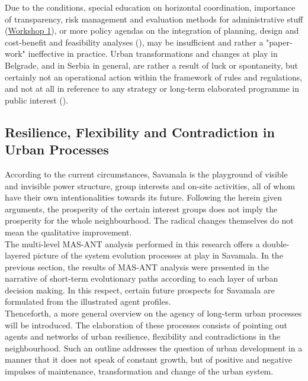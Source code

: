 \documentclass[11pt]{report}
\begin{document}
{Due to the conditions, special education on horizontal coordination, importance of transparency, risk management and evaluation methods for administrative stuff
(\href{Expert Workshop}{Workshop 1}),
or more policy agendas on the integration of planning, design and cost-benefit and feasibility analyses (\href{Zekovic}{\cite{Zekovic ??}}), may be insufficient and rather a "paper-work" ineffective in practice. 
Urban transformations and changes at play in Belgrade, and in Serbia in general, are rather a result of luck or spontaneity, but certainly not an operational action within the framework of rules and regulations, and not at all in reference to any strategy or long-term elaborated programme in public interest (\href{Vanista}{\cite{VanistaLazarevic2015}}).

\subsection{Resilience, Flexibility and Contradiction in Urban Processes}

According to the current circumstances, Savamala is the playground of visible and invisible power structure, group interests and on-site activities, all of whom have their own intentionalities towards its future.
Following the herein given arguments, the prosperity of the certain interest groups does not imply the prosperity for the whole neighbourhood. The radical changes themselves do not mean the qualitative improvement.
\\

The multi-level MAS-ANT analysis performed in this research offers a double-layered picture of the system evolution processes at play in Savamala.
In the previous section, the results of MAS-ANT analysis were presented in the narrative of short-term evolutionary paths according to each layer of urban decision making.
In this respect, certain future prospects for Savamala are formulated from the illustrated agent profiles.
\\

Thenceforth, a more general overview on the agency of long-term urban processes will be introduced. The elaboration of these processes consists of pointing out agents and networks of urban resilience, flexibility and contradictions in the neighbourhood.
Such an outline addresses the question of urban development in a manner that it does not speak of constant growth, but of positive and negative impulses of maintenance, transformation and change of the urban system.

}
\end{document}
